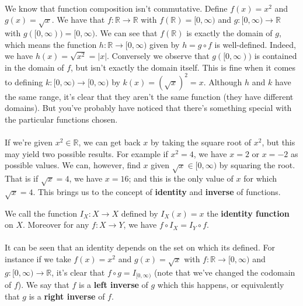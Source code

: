 \documentclass[12pt, a4paper, titlepage, twoside]{article}
\newcommand*{\R}{\mathbb{R}}
\begin{document}
	\paragraph{}
	We know that function composition isn't commutative.
	Define $f(x) = x^2$ and $g(x) = \sqrt{x}$. We have that $f : \R \to \R$ with $f(\R) = [0,\infty)$ and $g : [0,\infty) \to \R$
	with $g([0,\infty) ) = [0,\infty)$. We can see that $f(\R)$ is exactly the domain of $g$, which means
	the function $h : \R \to [0,\infty)$ given by $h = g \circ f$ is well-defined. Indeed, we have $h(x) = \sqrt{x^2} = |x|$.
	Conversely we observe that $g([0,\infty))$ is contained in the domain of $f$, but isn't exactly the domain itself.
	This is fine when it comes to defining $k : [0,\infty) \to [0,\infty)$ by $k(x) = (\sqrt{x})^2 = x$. Although $h$ and $k$ have
	the same range, it's clear that they aren't the same function (they have different domains). But you've probably have noticed that there's 
	something special with the particular functions chosen.
	
	\paragraph{}
	If we're given $x^2 \in \R$, we can get back $x$ by taking the square root of $x^2$, but this may yield two possible results. For example
	if $x^2 = 4$, we have $x = 2$ or $x = -2$ as possible values. We can, however, find $x$ given $\sqrt{x} \in [0,\infty)$ by
	squaring the root. That is if $\sqrt{x} = 4$, we have $x = 16$; and this is the only value of $x$ for which $\sqrt{x} = 4$.
	This brings us to the concept of \textbf{identity} and \textbf{inverse} of functions.\\
	
	\begin{kp}
		We call the function $I_X : X \to X$ defined by $I_X(x) = x$ the \textbf{identity function} on $X$. Moreover for any $f : X \to Y$, we have 
		$f \circ I_X = I_Y \circ f$.
	\end{kp} 
	
	\paragraph{}
	It can be seen that an identity depends on the set on which its defined. For instance if we take $f(x) = x^2$ and $g(x) = \sqrt{x}$
	with $f : \R \to [0,\infty)$ and $g : [0,\infty) \to \R$, it's clear that $f \circ g = I_{[0,\infty)}$ (note that we've changed
	the codomain of $f$). We say that $f$ is a \textbf{left inverse} of $g$ which this happens, or equivalently that $g$ is a \textbf{right inverse} 
	of $f$.\\
	
\end{document}
